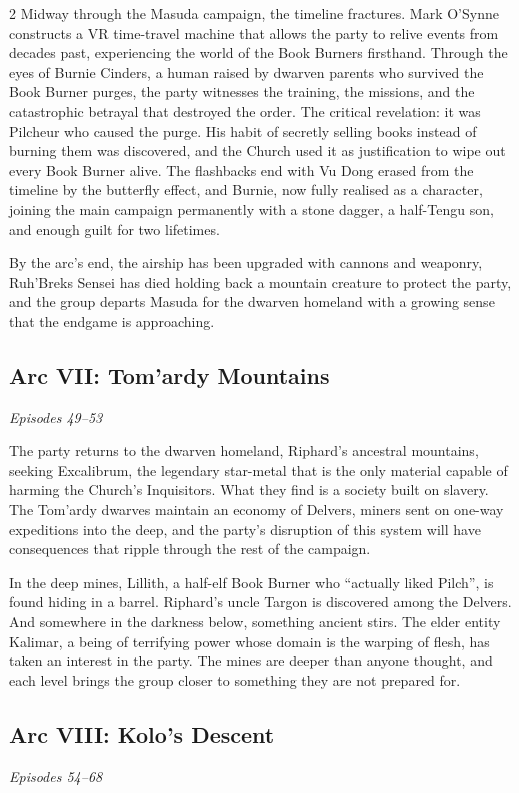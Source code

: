 \begin{multicols}{2}
Midway through the Masuda campaign, the timeline fractures.  Mark O'Synne constructs a VR time-travel machine that allows the party to relive events from decades past, experiencing the world of the Book Burners firsthand.  Through the eyes of Burnie Cinders, a human raised by dwarven parents who survived the Book Burner purges, the party witnesses the training, the missions, and the catastrophic betrayal that destroyed the order.  The critical revelation: it was Pilcheur who caused the purge.  His habit of secretly selling books instead of burning them was discovered, and the Church used it as justification to wipe out every Book Burner alive.  The flashbacks end with Vu Dong erased from the timeline by the butterfly effect, and Burnie, now fully realised as a character, joining the main campaign permanently with a stone dagger, a half-Tengu son, and enough guilt for two lifetimes.

By the arc's end, the airship has been upgraded with cannons and weaponry, Ruh'Breks Sensei has died holding back a mountain creature to protect the party, and the group departs Masuda for the dwarven homeland with a growing sense that the endgame is approaching.

\subsection*{Arc VII: Tom'ardy Mountains}
\textit{Episodes 49--53}

\medskip

\noindent
The party returns to the dwarven homeland, Riphard's ancestral mountains, seeking Excalibrum, the legendary star-metal that is the only material capable of harming the Church's Inquisitors.  What they find is a society built on slavery.  The Tom'ardy dwarves maintain an economy of Delvers, miners sent on one-way expeditions into the deep, and the party's disruption of this system will have consequences that ripple through the rest of the campaign.

In the deep mines, Lillith, a half-elf Book Burner who ``actually liked Pilch'', is found hiding in a barrel.  Riphard's uncle Targon is discovered among the Delvers.  And somewhere in the darkness below, something ancient stirs.  The elder entity Kalimar, a being of terrifying power whose domain is the warping of flesh, has taken an interest in the party.  The mines are deeper than anyone thought, and each level brings the group closer to something they are not prepared for.

\subsection*{Arc VIII: Kolo's Descent}
\textit{Episodes 54--68}


\end{multicols}
